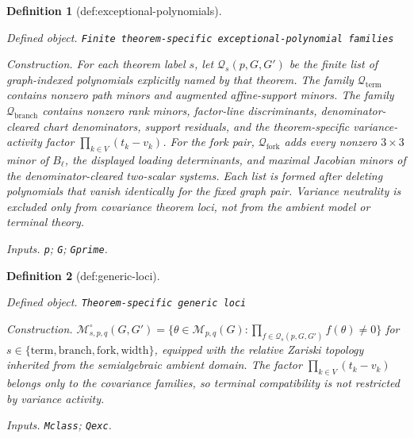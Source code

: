 \documentclass{article}
\newtheorem{definition}{Definition}
\begin{document}
\begin{definition}[def:exceptional-polynomials]\label{def:exceptional-polynomials}
\par\smallskip\noindent\emph{Defined object.} \texttt{Finite theorem-\allowbreak{}specific exceptional-\allowbreak{}polynomial families}
\par\smallskip\noindent\emph{Construction.} For each theorem label \(s\), let \(\mathcal Q_s(p,G,G')\) be the finite list of graph-indexed polynomials explicitly named by that theorem. The family \(\mathcal Q_{\mathrm{term}}\) contains nonzero path minors and augmented affine-support minors. The family \(\mathcal Q_{\mathrm{branch}}\) contains nonzero rank minors, factor-line discriminants, denominator-cleared chart denominators, support residuals, and the theorem-specific variance-activity factor \(\prod_{k\in V}(t_k-v_k)\). For the fork pair, \(\mathcal Q_{\mathrm{fork}}\) adds every nonzero \(3\times3\) minor of \(B_{\ell}\), the displayed loading determinants, and maximal Jacobian minors of the denominator-cleared two-scalar systems. Each list is formed after deleting polynomials that vanish identically for the fixed graph pair. Variance neutrality is excluded only from covariance theorem loci, not from the ambient model or terminal theory.
\par\smallskip\noindent\emph{Inputs.} \texttt{p}; \texttt{G}; \texttt{Gprime}.
\end{definition}

\begin{definition}[def:generic-loci]\label{def:generic-loci}
\par\smallskip\noindent\emph{Defined object.} \texttt{Theorem-\allowbreak{}specific generic loci}
\par\smallskip\noindent\emph{Construction.} \(\mathcal M^{\circ}_{s,p,q}(G,G')=\{\theta\in\mathcal M_{p,q}(G):\prod_{f\in\mathcal Q_s(p,G,G')}f(\theta)\ne0\}\) for \(s\in\{\mathrm{term},\mathrm{branch},\mathrm{fork},\mathrm{width}\}\), equipped with the relative Zariski topology inherited from the semialgebraic ambient domain. The factor \(\prod_{k\in V}(t_k-v_k)\) belongs only to the covariance families, so terminal compatibility is not restricted by variance activity.
\par\smallskip\noindent\emph{Inputs.} \texttt{Mclass}; \texttt{Qexc}.
\end{definition}
\end{document}

